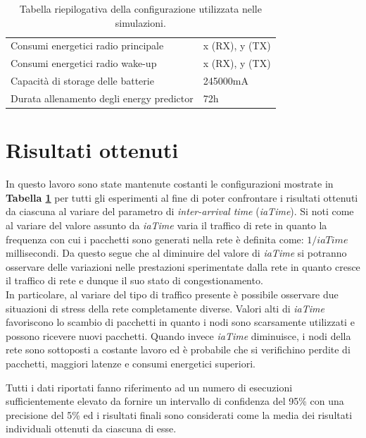 \documentclass[binding=0.6cm,TFA]{sapthesis}
\begin{document}
\begin{table}[h]
\begin{tabular}{ |p{8cm}|p{4cm}|  }
        Consumi energetici radio principale             & x (RX), y (TX)                            \\
        Consumi energetici radio wake-up                & x (RX), y (TX)                            \\
        Capacità di storage delle batterie              & 245000mA                                  \\
        Durata allenamento degli energy predictor       & 72h                                       \\
        \hline
    \end{tabular}
    \centering
    \vspace*{5mm}
    \caption{Tabella riepilogativa della configurazione utilizzata nelle simulazioni.}
    \label{configs}
\end{table}

\section{Risultati ottenuti}

In questo lavoro sono state mantenute costanti le configurazioni mostrate in \textbf{Tabella \ref{configs}} per tutti gli esperimenti al fine di poter
confrontare i risultati ottenuti da ciascuna al variare del parametro di \emph{inter-arrival time} (\emph{iaTime}). Si noti come al variare del valore assunto
da \emph{iaTime} varia il traffico di rete in quanto la frequenza con cui i pacchetti sono generati nella rete è definita come: $1/iaTime$ millisecondi.
Da questo segue che al diminuire del valore di \emph{iaTime} si potranno osservare delle variazioni nelle prestazioni sperimentate dalla rete in quanto
cresce il traffico di rete e dunque il suo stato di congestionamento.\\

In particolare, al variare del tipo di traffico presente è possibile osservare due situazioni di stress della rete completamente diverse. Valori alti di \emph{iaTime}
favoriscono lo scambio di pacchetti in quanto i nodi sono scarsamente utilizzati e possono ricevere nuovi pacchetti. Quando invece \emph{iaTime} diminuisce, i
nodi della rete sono sottoposti a costante lavoro ed è probabile che si verifichino perdite di pacchetti, maggiori latenze e consumi energetici superiori.

Tutti i dati riportati fanno riferimento ad un numero di esecuzioni sufficientemente elevato da fornire un intervallo di confidenza del 95\% con una precisione
del 5\% ed i risultati finali sono considerati come la media dei risultati individuali ottenuti da ciascuna di esse.\\
\end{document}
